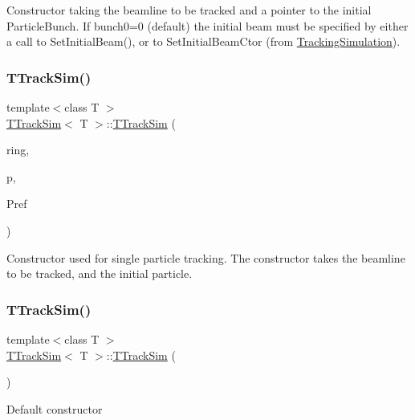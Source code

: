 Constructor taking the beamline to be tracked and a pointer to the initial Particle\+Bunch. If bunch0=0 (default) the initial beam must be specified by either a call to Set\+Initial\+Beam(), or to Set\+Initial\+Beam\+Ctor (from \hyperlink{classTrackingSimulation}{Tracking\+Simulation}). \mbox{\label{classTTrackSim_a780f5bbaf5169f555733a6fc22f85c67}} 
\subsubsection{\texorpdfstring{T\+Track\+Sim()}{TTrackSim()}\hspace{0.1cm}{\footnotesize\ttfamily [4/5]}}
{\footnotesize\ttfamily template$<$class T $>$ \\
\hyperlink{classTTrackSim}{T\+Track\+Sim}$<$ T $>$\+::\hyperlink{classTTrackSim}{T\+Track\+Sim} (\begin{DoxyParamCaption}\item[{const \hyperlink{classring__iterator}{Accelerator\+Model\+::\+Ring\+Iterator} \&}]{ring,  }\item[{const particle\+\_\+type \&}]{p,  }\item[{double}]{Pref }\end{DoxyParamCaption})}

Constructor used for single particle tracking. The constructor takes the beamline to be tracked, and the initial particle. \mbox{\label{classTTrackSim_a2a1ab40b2628c61bc1da6cf41349a9a7}} 
\subsubsection{\texorpdfstring{T\+Track\+Sim()}{TTrackSim()}\hspace{0.1cm}{\footnotesize\ttfamily [5/5]}}
{\footnotesize\ttfamily template$<$class T $>$ \\
\hyperlink{classTTrackSim}{T\+Track\+Sim}$<$ T $>$\+::\hyperlink{classTTrackSim}{T\+Track\+Sim} (\begin{DoxyParamCaption}{ }\end{DoxyParamCaption})}

Default constructor 

